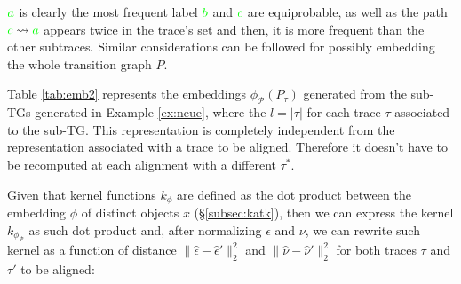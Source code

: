\begin{example}

${\color{green}a}$ is clearly the most frequent label ${\color{green}b}$ and ${\color{green}c}$ are equiprobable, as well as the path ${\color{green}c}\rightsquigarrow {\color{green}a}$ appears twice in the trace's set and then, it is more frequent than the other subtraces. {Similar considerations can be followed for possibly embedding the whole transition graph $P$.}


 Table \ref{tab:emb2} represents the embeddings $\phi_{\mathcal{P}}(P_\tau)$ generated from the sub-TGs generated in Example \ref{ex:neue}, where the $l=|\tau|$ for each trace $\tau$ associated to the sub-TG. This representation is completely independent from the representation associated with a trace to be aligned. Therefore it doesn't have to be recomputed at each alignment with a different $\tau^*$.
\end{example}


Given that kernel functions $k_\phi$ are defined as the dot product between the embedding $\phi$ of distinct objects $x$ (\S\ref{subsec:katk}), then we can express the kernel $k_{\phi_{\mathcal{P}}}$ as such dot product and, after normalizing $\epsilon$ and $\nu$, we can rewrite such kernel 
{as a function of distance  $\|\hat{\epsilon}-\hat{\epsilon}'\|_2^2$ and $\|\hat{\nu}-\hat{\nu}'\|_2^2$ for both traces $\tau$ and $\tau'$ to be aligned:}

